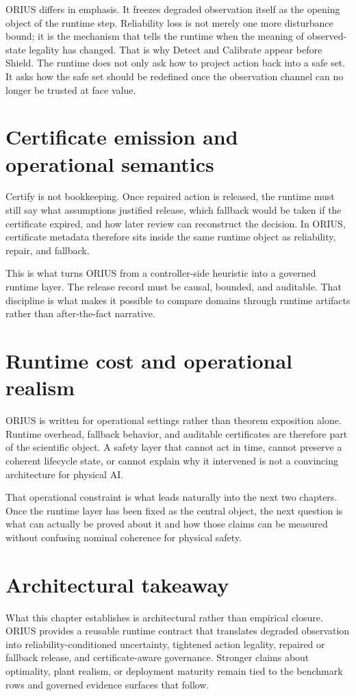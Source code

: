 ORIUS differs in emphasis. It freezes degraded observation itself as the opening object of
the runtime step. Reliability loss is not merely one more disturbance bound; it is the
mechanism that tells the runtime when the meaning of observed-state legality has changed.
That is why Detect and Calibrate appear before Shield. The runtime does not only ask how to
project action back into a safe set. It asks how the safe set should be redefined once the
observation channel can no longer be trusted at face value.

\section{Certificate emission and operational semantics}
Certify is not bookkeeping. Once repaired action is released, the runtime must still say
what assumptions justified release, which fallback would be taken if the certificate
expired, and how later review can reconstruct the decision. In ORIUS, certificate metadata
therefore sits inside the same runtime object as reliability, repair, and fallback.

This is what turns ORIUS from a controller-side heuristic into a governed runtime layer. The
release record must be causal, bounded, and auditable. That discipline is what makes it
possible to compare domains through runtime artifacts rather than after-the-fact narrative.

\section{Runtime cost and operational realism}
ORIUS is written for operational settings rather than theorem exposition alone. Runtime
overhead, fallback behavior, and auditable certificates are therefore part of the scientific
object. A safety layer that cannot act in time, cannot preserve a coherent lifecycle state,
or cannot explain why it intervened is not a convincing architecture for physical AI.

That operational constraint is what leads naturally into the next two chapters. Once the
runtime layer has been fixed as the central object, the next question is what can actually
be proved about it and how those claims can be measured without confusing nominal coherence
for physical safety.

\section{Architectural takeaway}
What this chapter establishes is architectural rather than empirical closure. ORIUS provides
a reusable runtime contract that translates degraded observation into
reliability-conditioned uncertainty, tightened action legality, repaired or fallback
release, and certificate-aware governance. Stronger claims about optimality, plant realism,
or deployment maturity remain tied to the benchmark rows and governed evidence surfaces that
follow.
